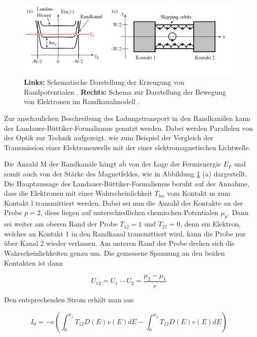 \begin{figure}[h]
	\centering
	\includegraphics[width=0.7\linewidth]{images/Anleitungsheft/Randkanalmodell_Anleitungsheft.png}
	\caption[Schema Randkanalmodell]{\textbf{Links:} Schematische Darstellung der Erzeugung von Randpotentialen \cite{anleitung}. \textbf{Rechts:} Schema zur Darstellung der Bewegung von Elektronen im Randkanalmodell \cite{anleitung}.}
	\label{fig:Randkanalmodell_Anleitungsheft}
\end{figure}

Zur anschaulichen Beschreibung des Ladungstransport in den Randkanälen kann der Landauer-Büttiker-Formalismus genutzt werden. 
Dabei werden Parallelen von der Optik zur Technik aufgezeigt, wie zum Beispiel der Vergleich der Transmission einer Elektronenwelle mit der einer elektromagnetischen Lichtwelle. 

Die Anzahl M der Randkanäle hängt ab von der Lage der Fermienergie $E_F$ und somit auch von der Stärke des Magnetfeldes, wie in Abbildung \ref{fig:Randkanalmodell_Anleitungsheft} (a) dargestellt.
Die Hauptaussage des Landauer-Büttiker-Formalismus beruht auf der Annahme, dass die Elektronen mit einer Wahrscheinlichkeit $T_{lm}$ vom Kontakt m zum Kontakt l transmittiert werden. Dabei sei nun die Anzahl der Kontakte an der Probe $p=2$, diese liegen auf unterschiedlichen chemischen Potentialen $\mu_p$. Dann sei weiter am oberen Rand der Probe $T_{12}=1$ und $T_{21}=0$, denn ein Elektron, welches an Kontakt 1 in den Randkanal transmittiert wird, kann die Probe nur über Kanal 2 wieder verlassen. Am unteren Rand der Probe drehen sich die Wahrscheinlichkeiten genau um.  
Die gemessene Spannung an den beiden Kontakten ist dann

\begin{equation}
U_{12}=U_1 - U_2= \frac{\mu_2-\mu_1}{e}
\label{eq:spannung_randkanal}
\end{equation}

Den entsprechenden Strom erhält man aus 

\begin{equation}
I_0=-e(\int^{\mu_1}_0T_{12}D(E)v(E)dE-\int^{\mu_2}_0T_{12}D(E)v(E)dE)
\label{eq:strom_randkanal}
\end{equation}

